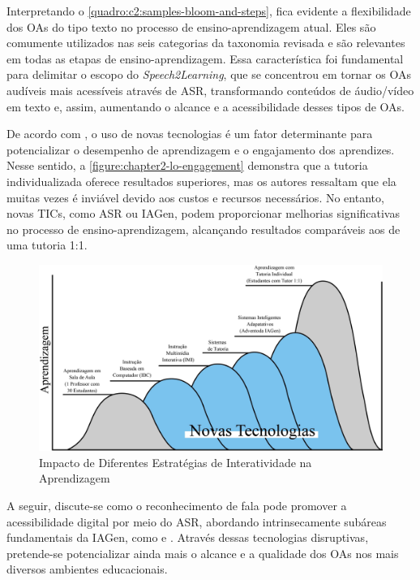 Interpretando o \autoref{quadro:c2:samples-bloom-and-steps}, fica evidente a flexibilidade dos OAs do tipo texto no processo de ensino-aprendizagem atual. Eles são comumente utilizados nas seis categorias da taxonomia revisada e são relevantes em todas as etapas de ensino-aprendizagem. Essa característica foi fundamental para delimitar o escopo do \textit{Speech2Learning}, que se concentrou em tornar os OAs audíveis mais acessíveis através de ASR, transformando conteúdos de áudio/vídeo em texto e, assim, aumentando o alcance e a acessibilidade desses tipos de OAs.

De acordo com , o uso de novas tecnologias é um fator determinante para potencializar o desempenho de aprendizagem e o engajamento dos aprendizes. Nesse sentido, a \autoref{figure:chapter2-lo-engagement} demonstra que a tutoria individualizada oferece resultados superiores, mas os autores ressaltam que ela muitas vezes é inviável devido aos custos e recursos necessários. No entanto, novas TICs, como ASR ou IAGen, podem proporcionar melhorias significativas no processo de ensino-aprendizagem, alcançando resultados comparáveis aos de uma tutoria 1:1.

\begin{figure}[htb]
\centering
\caption{Impacto de Diferentes Estratégias de Interatividade na Aprendizagem}
\label{figure:chapter2-lo-engagement}
\includegraphics[width=.94\textwidth]{images/chapter2-lo-engagement.jpg}
\end{figure}

A seguir, discute-se como o reconhecimento de fala pode promover a acessibilidade digital por meio do ASR, abordando intrinsecamente subáreas fundamentais da IAGen, como  e . Através dessas tecnologias disruptivas, pretende-se potencializar ainda mais o alcance e a qualidade dos OAs nos mais diversos ambientes educacionais.


